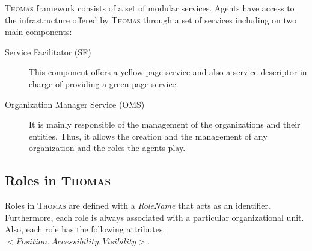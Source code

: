 \textsc{Thomas} framework consists of a set of modular services. Agents have access to the infrastructure offered by \textsc{Thomas} through a set of services including on two main components:

\begin{description}
	\item [Service Facilitator (SF)] This component offers a yellow page service and also a service descriptor in charge of providing a green page service.
	\item [Organization Manager Service (OMS)] It is mainly responsible of the management of the organizations and their entities. Thus, it allows the creation and the management of any organization and the roles the agents play.
\end{description}

\subsection{Roles in \textsc{Thomas}}

Roles  in \textsc{Thomas} are defined with a \textit{RoleName} that acts as an identifier. Furthermore, each role is always associated with a particular organizational unit. Also, each role has the following attributes: $<Position, Accessibility, Visibility>$.

